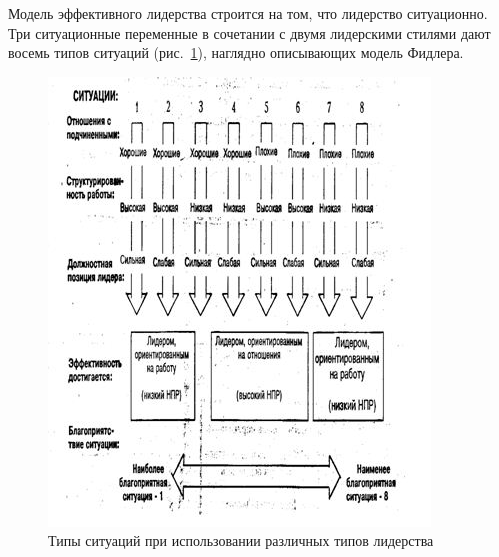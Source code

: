 \documentclass[a4paper,12pt,oneside,final]{extarticle}
\makeatletter
\numberwithin{equation}{section}
\def\maxwidth#1{\ifdim\Gin@nat@width>#1 #1\else\Gin@nat@width\fi}
\makeatother
\begin{document}
Модель эффективного лидерства строится на том, что лидерство ситуационно. 
Три ситуационные переменные в сочетании с двумя лидерскими стилями дают восемь типов ситуаций (рис.~\ref{leadership_fd}), наглядно описывающих модель Фидлера.

\begin{figure}[h]
	\centering
	\includegraphics[width=\maxwidth{\textwidth}]{management-figures/leadership_fd}
	\caption{Типы ситуаций при использовании различных типов лидерства}
	\label{leadership_fd}
\end{figure}
\end{document}
